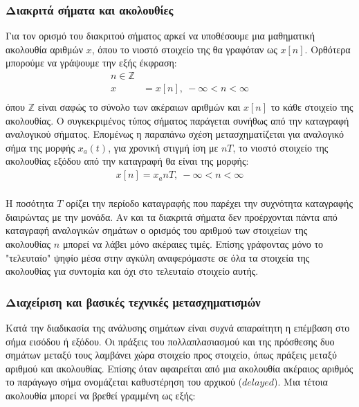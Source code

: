 \documentclass[breaklines=true, 12pt]{article}
\begin{document}
\subsubsection{Διακριτά σήματα και ακολουθίες}
\label{sec:org2068381}
Για τον ορισμό του διακριτού σήματος αρκεί να υποθέσουμε μια μαθηματική
ακολουθία αριθμών \(x\), όπου το νιοστό στοιχείο της θα γραφόταν ως \(x[n]\).
Ορθότερα μπορούμε να γράψουμε την εξής έκφραση:
\begin{equation}
\begin{align}
n \in \mathbb{Z} \\
x &= {x[n]},\  -\infty < n < \infty \\
\end{align}
\end{equation}
όπου \(\mathbb{Z}\) είναι σαφώς το σύνολο των ακέραιων αριθμών και \(x[n]\) το κάθε στοιχείο
της ακολουθίας. Ο συγκεκριμένος τύπος σήματος παράγεται συνήθως από την
καταγραφή αναλογικού σήματος. Επομένως η παραπάνω σχέση μετασχηματίζεται
για αναλογικό σήμα της μορφής \(x_{a}(t)\), για χρονική στιγμή ίση με \(nT\), το
νιοστό στοιχείο της ακολουθίας εξόδου από την καταγραφή θα είναι της
μορφής:
\begin{equation}
\begin{align}
x[n] = x_{a} nT,\ -\infty < n < \infty \\
\end{align}
\end{equation}

Η ποσότητα \(T\) ορίζει την περίοδο καταγραφής που παρέχει την συχνότητα
καταγραφής διαιρώντας με την μονάδα. Αν και τα διακριτά σήματα δεν
προέρχονται πάντα από καταγραφή αναλογικών σημάτων ο ορισμός του αριθμού
των στοιχείων της ακολουθίας \(n\) μπορεί να λάβει μόνο ακέραιες τιμές. Επίσης
γράφοντας μόνο το "τελευταίο" ψηφίο μέσα στην αγκύλη αναφερόμαστε σε όλα
τα στοιχεία της ακολουθίας για συντομία και όχι στο τελευταίο στοιχείο
αυτής.
\subsubsection{Διαχείριση και βασικές τεχνικές μετασχηματισμών}
\label{sec:org4114404}
Κατά την διαδικασία της ανάλυσης σημάτων είναι συχνά απαραίτητη η επέμβαση
στο σήμα εισόδου ή εξόδου. Οι πράξεις του πολλαπλασιασμού και της πρόσθεσης
δυο σημάτων μεταξύ τους λαμβάνει χώρα στοιχείο προς στοιχείο, όπως πράξεις
μεταξύ αριθμού και ακολουθίας. Επίσης όταν αφαιρείται από μια ακολουθία
ακέραιος αριθμός το παράγωγο σήμα ονομάζεται καθυστέρηση του αρχικού
(\(delayed\)). Μια τέτοια ακολουθία μπορεί να βρεθεί γραμμένη ως εξής:
\end{document}
